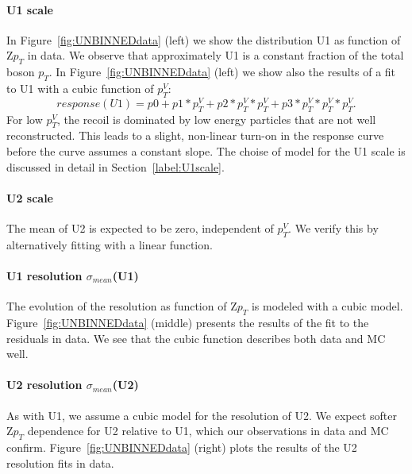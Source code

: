 \documentclass[41pt,a4paper,oneside]{report}
\begin{document}
\paragraph{U1 scale}
In Figure~\ref{fig:UNBINNEDdata} (left) we show the distribution U1 as function of Z$p_{T}$ in data.
We observe that approximately U1 is a constant fraction of the total boson $p_{T}$.
In Figure~\ref{fig:UNBINNEDdata} (left) we show also the results of a fit to U1 with 
a cubic function of $p^{V}_{T}$: 
\begin{equation}
response(U1) = p0 + p1 * p^{V}_{T} + p2 * p^{V}_{T} * p^{V}_{T} + p3 * p^{V}_{T} * p^{V}_{T} * p^{V}_{T}.
\end{equation}
For low $p^{V}_{T}$, the recoil is dominated by low energy particles that are not well reconstructed.
This leads to a slight, non-linear turn-on in the response curve before the curve assumes a constant slope.
The choise of model for the U1 scale is discussed in detail in Section~\ref{label:U1scale}. 

\paragraph{U2 scale}
The mean of U2 is expected to be zero, independent of $p^{V}_{T}$. We verify this by alternatively fitting with a linear
function. 

\paragraph{U1 resolution $\sigma_{mean}$(U1)}
The evolution of the resolution as function of Z$p_{T}$ is modeled with a cubic model. 
Figure~\ref{fig:UNBINNEDdata} (middle) presents the results of the fit to the residuals in data.
We see that the cubic function describes both data and MC well. 

\paragraph{U2 resolution $\sigma_{mean}$(U2)}
As with U1, we assume a cubic model for the resolution of U2. We expect softer Z$p_{T}$ dependence for U2 relative to U1,
which our observations in data and MC confirm.
Figure~\ref{fig:UNBINNEDdata} (right) plots the results of the U2 resolution fits in data. 
\end{document}
